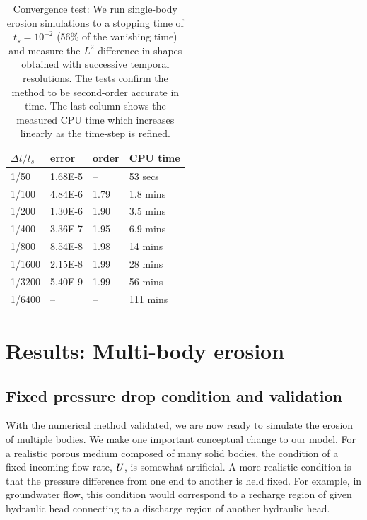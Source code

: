 \documentclass[preprint, 10pt]{elsarticle}
\begin{document}
\begin{table}%
\begin{center}
\caption{Convergence test: We run single-body erosion simulations to a stopping time of $t_s = 10^{-2}$ (56\% of the vanishing time) and measure the $L^2$-difference in shapes obtained with successive temporal resolutions. The tests confirm the method to be second-order accurate in time. The last column shows the measured CPU time which increases linearly as the time-step is refined.
}
\vspace{0.3 pc}
\label{convtab}
\begin{tabular}{l l l l}
\hline
\hspace{0.0pc} $\Delta t/t_s$
\hspace{0.5pc} & error 
\hspace{0.5pc} & order
\hspace{0.5pc} & CPU time \\
\hline
%
1/50		& 1.68E-5		& --		& 53 secs     	\\
1/100	& 4.84E-6		& 1.79	& 1.8 mins   	\\
1/200	& 1.30E-6		& 1.90	& 3.5 mins  	\\
1/400	& 3.36E-7		& 1.95	& 6.9 mins  	\\
1/800	& 8.54E-8		& 1.98	& 14 mins   	\\
1/1600	& 2.15E-8		& 1.99	& 28 mins  	\\
1/3200	& 5.40E-9		& 1.99	& 56 mins    	\\
1/6400	& --			& --		& 111 mins	\\
%
\hline
\end{tabular}
\end{center}
\end{table}


\section{Results: Multi-body erosion}
\label{s:MultiResults}

\subsection{Fixed pressure drop condition and validation}

With the numerical method validated, we are now ready to simulate the erosion of multiple bodies. We make one important conceptual change to our model. For a realistic porous medium composed of many solid bodies, the condition of a fixed incoming flow rate, $U$, is somewhat artificial. A more realistic condition is that the pressure difference from one end to another is held fixed. For example, in groundwater flow, this condition would correspond to a recharge region of given hydraulic head connecting to a discharge region of another hydraulic head. 
\end{document}
